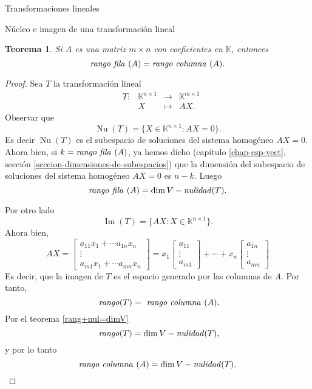 \documentclass[a4paper,12pt,twoside,spanish,reqno]{amsbook}
\numberwithin{equation}{section}
\newtheorem{teorema}{Teorema}[section]
\theoremstyle{definition}
\theoremstyle{remark}
\newcommand{\img}{\operatorname{Im}}
\newcommand{\nuc}{\operatorname{Nu}}
\newcommand{\K}{\mathbb K}
\begin{document}
\begin{chapter}{Transformaciones lineales}
\begin{section}{Núcleo e imagen de una transformación lineal}
        \begin{teorema}
            Si $A$ es una matriz $m \times n$ con coeficientes  en $\K$, entonces
            $$
            \text{\textit{rango fila }} (A) = \text{\textit{rango  columna }} (A).
            $$
        \end{teorema}
        \begin{proof}
            Sea $T$ la transformación lineal
            \begin{equation*}
                \begin{array}{lllll}
                &T: &\K^{n \times 1} &\to &\K^{m \times 1} \\
                &&X &\mapsto &AX.
                \end{array}
            \end{equation*}
            Observar que
            $$
            \nuc(T) = \{X \in \K^{n \times 1}: AX=0 \}.
            $$
            Es decir $\nuc(T)$  es el subespacio de soluciones del sistema homogéneo $AX=0$. Ahora bien, si $k = \text{\textit{rango fila }} (A)$, ya hemos dicho (capítulo \ref{chap-esp-vect}, sección \ref{seccion-dimensiones-de-subespacios}) que la dimensión del subespacio de soluciones del sistema homogéneo $AX=0$ es $n-k$. Luego
            \begin{equation}\label{rangofila=n-nulT}
                \text{\textit{rango fila }} (A) = \dim V - \text{\textit{nulidad}}(T). 
            \end{equation}
            
            Por otro lado 
            $$
            \img(T) = \{AX: X \in \K^{n \times 1} \}.
            $$
            Ahora bien, 
            $$
            AX = 
            \begin{bmatrix} a_{11} x_1 +\cdots a_{1n} x_n \\ \vdots \\ a_{m1} x_1 +\cdots a_{mn} x_n  \end{bmatrix}
            = 
            x_1\begin{bmatrix} a_{11} \\ \vdots \\ a_{m1} \end{bmatrix} + \cdots +
            x_n\begin{bmatrix}  a_{1n}  \\ \vdots \\ a_{mn}  \end{bmatrix}
            $$
            Es decir, que la imagen de $T$ es el espacio generado por las columnas de $A$. Por tanto,
            $$
            \text{\textit{ rango}}(T) =\text{\textit{ rango  columna }}(A).
            $$
            Por  el  teorema \ref{rang+nul=dimV}
            $$
            \text{\textit{ rango}}(T) = \dim V - \text{\textit{nulidad}}(T),
            $$
            y por lo tanto
            \begin{equation}\label{rangocolumna=n-nulT}
            \text{\textit{rango columna }} (A) = \dim V - \text{\textit{nulidad}}(T). 
            \end{equation}
            

\end{proof}
\end{section}
\end{chapter}
\end{document}
